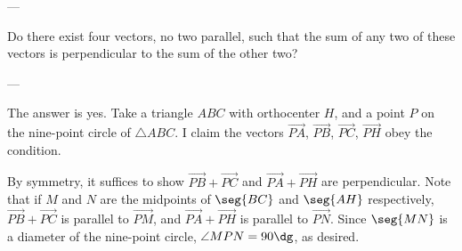 
---

Do there exist four vectors, no two parallel, such that the sum of any two of these vectors is perpendicular to the sum of the other two?

---

The answer is yes. Take a triangle $ABC$ with orthocenter $H$, and a point $P$ on the nine-point circle of $\triangle ABC$. I claim the vectors $\vec{PA}$, $\vec{PB}$, $\vec{PC}$, $\vec{PH}$ obey the condition.

By symmetry, it suffices to show $\vec{PB}+\vec{PC}$ and $\vec{PA}+\vec{PH}$ are perpendicular. Note that if $M$ and $N$ are the midpoints of $\seg{BC}$ and $\seg{AH}$ respectively, $\vec{PB}+\vec{PC}$ is parallel to $\vec{PM}$, and $\vec{PA}+\vec{PH}$ is parallel to $\vec{PN}$. Since $\seg{MN}$ is a diameter of the nine-point circle, $\angle MPN=90\dg$, as desired.
